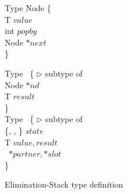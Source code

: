 

\begin{figure*}[]
	\small
\begin{flushleft}
	Type Node \{ \\
	\hspace*{6mm} T $value$ \\
	\hspace*{6mm} int $popby$ \\
	\hspace*{6mm} Node $*next$ \\
	\} \\
	

	Type \csInfo\ \{ \hspace*{22.0mm} $\triangleright$ subtype of \Info \\
	\hspace*{6mm} Node $*nd$ \\
	\hspace*{6mm} T $result$ \\
	\} \\
	
	Type \exInfo\ \{ \hspace*{24.0mm} $\triangleright$ subtype of \Info \\
	\hspace*{6mm} \{\emptyst, \waiting, \busy\} $state$ \\
	\hspace*{6mm} T $value, result$ \\
	\hspace*{6mm} \exInfo\ $*partner, *slot$ \\
	\}
	
\end{flushleft}	
	\caption{Elimination-Stack type definition}
\end{figure*}



